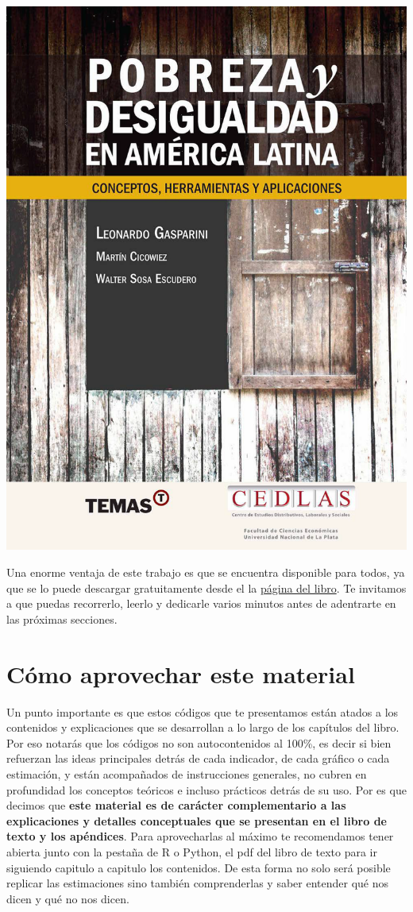 \documentclass[
]{book}
\begin{document}
\begin{center}\includegraphics[width=0.6\linewidth]{portada_libro} \end{center}

Una enorme ventaja de este trabajo es que se encuentra disponible para todos, ya que se lo puede descargar gratuitamente desde el la \href{https://www.cedlas.econo.unlp.edu.ar/wp/publicaciones/libros/pobreza-y-desigualdad-en-america-latina/}{página del libro}. Te invitamos a que puedas recorrerlo, leerlo y dedicarle varios minutos antes de adentrarte en las próximas secciones.

\hypertarget{cuxf3mo-aprovechar-este-material}{%
\section*{Cómo aprovechar este material}\label{cuxf3mo-aprovechar-este-material}}

Un punto importante es que estos códigos que te presentamos están atados a los contenidos y explicaciones que se desarrollan a lo largo de los capítulos del libro. Por eso notarás que los códigos no son autocontenidos al 100\%, es decir si bien refuerzan las ideas principales detrás de cada indicador, de cada gráfico o cada estimación, y están acompañados de instrucciones generales, no cubren en profundidad los conceptos teóricos e incluso prácticos detrás de su uso. Por es que decimos que \textbf{este material es de carácter complementario a las explicaciones y detalles conceptuales que se presentan en el libro de texto y los apéndices}. Para aprovecharlas al máximo te recomendamos tener abierta junto con la pestaña de R o Python, el pdf del libro de texto para ir siguiendo capitulo a capitulo los contenidos. De esta forma no solo será posible replicar las estimaciones sino también comprenderlas y saber entender qué nos dicen y qué no nos dicen.
\end{document}
